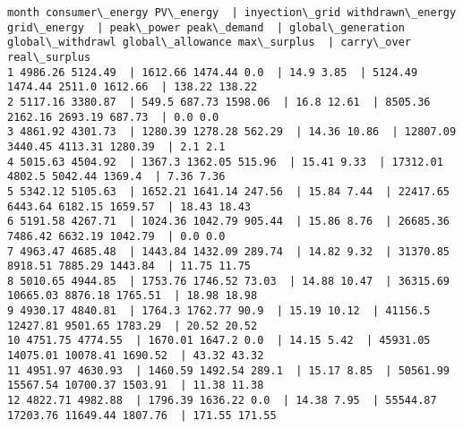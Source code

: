 \documentclass[11pt]{article}
\begin{document}
    \begin{Verbatim}[commandchars=\\\{\}]
month consumer\_energy PV\_energy  | inyection\_grid withdrawn\_energy grid\_energy  | peak\_power peak\_demand  | global\_generation global\_withdrawl global\_allowance max\_surplus  | carry\_over real\_surplus
1 4986.26 5124.49  | 1612.66 1474.44 0.0  | 14.9 3.85  | 5124.49 1474.44 2511.0 1612.66  | 138.22 138.22
2 5117.16 3380.87  | 549.5 687.73 1598.06  | 16.8 12.61  | 8505.36 2162.16 2693.19 687.73  | 0.0 0.0
3 4861.92 4301.73  | 1280.39 1278.28 562.29  | 14.36 10.86  | 12807.09 3440.45 4113.31 1280.39  | 2.1 2.1
4 5015.63 4504.92  | 1367.3 1362.05 515.96  | 15.41 9.33  | 17312.01 4802.5 5042.44 1369.4  | 7.36 7.36
5 5342.12 5105.63  | 1652.21 1641.14 247.56  | 15.84 7.44  | 22417.65 6443.64 6182.15 1659.57  | 18.43 18.43
6 5191.58 4267.71  | 1024.36 1042.79 905.44  | 15.86 8.76  | 26685.36 7486.42 6632.19 1042.79  | 0.0 0.0
7 4963.47 4685.48  | 1443.84 1432.09 289.74  | 14.82 9.32  | 31370.85 8918.51 7885.29 1443.84  | 11.75 11.75
8 5010.65 4944.85  | 1753.76 1746.52 73.03  | 14.88 10.47  | 36315.69 10665.03 8876.18 1765.51  | 18.98 18.98
9 4930.17 4840.81  | 1764.3 1762.77 90.9  | 15.19 10.12  | 41156.5 12427.81 9501.65 1783.29  | 20.52 20.52
10 4751.75 4774.55  | 1670.01 1647.2 0.0  | 14.15 5.42  | 45931.05 14075.01 10078.41 1690.52  | 43.32 43.32
11 4951.97 4630.93  | 1460.59 1492.54 289.1  | 15.17 8.85  | 50561.99 15567.54 10700.37 1503.91  | 11.38 11.38
12 4822.71 4982.88  | 1796.39 1636.22 0.0  | 14.38 7.95  | 55544.87 17203.76 11649.44 1807.76  | 171.55 171.55

    \end{Verbatim}
\end{document}
